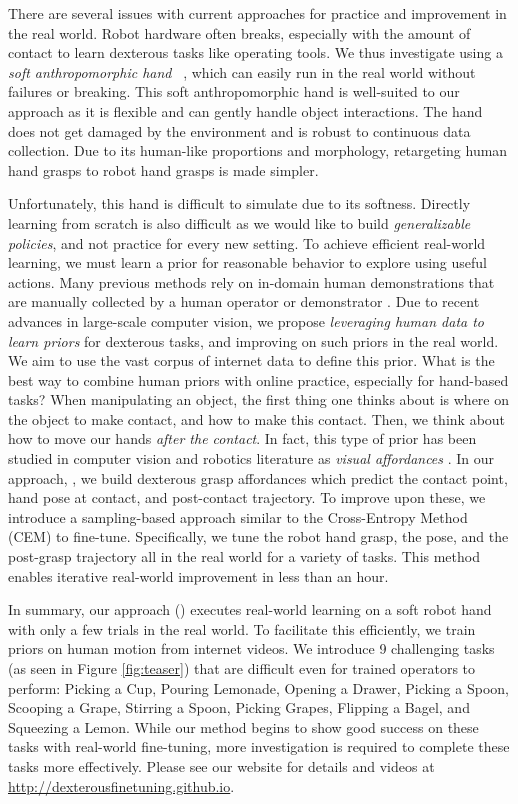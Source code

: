 There are several issues with current approaches for practice and improvement in the real world. Robot hardware often breaks, especially with the amount of contact to learn dexterous tasks like operating tools. We thus investigate using a \textit{soft anthropomorphic hand} ~\cite{mannam2023framework}, which can easily run in the real world without failures or breaking. This soft anthropomorphic hand is well-suited to our approach as it is flexible and can gently handle object interactions. The hand does not get damaged by the environment and is robust to continuous data collection. Due to its human-like proportions and morphology, retargeting human hand grasps to robot hand grasps is made simpler.  

Unfortunately, this hand is difficult to simulate due to its softness. Directly learning from scratch is also difficult as we would like to build \textit{generalizable policies}, and not practice for every new setting.  To achieve efficient real-world learning, we must learn a prior for reasonable behavior to explore using useful actions.  Many previous methods rely on in-domain human demonstrations that are manually collected by a human operator or demonstrator \cite{shaw2022video, zhao2023learning, pomerleau1988alvinn, mandlekar2021matters}. Due to recent advances in large-scale computer vision, we propose \textit{leveraging human data to learn priors} for dexterous tasks, and improving on such priors in the real world. We aim to use the vast corpus of internet data to define this prior. What is the best way to combine human priors with online practice, especially for hand-based tasks? When manipulating an object, the first thing one thinks about is where on the object to make contact, and how to make this contact. Then, we think about how to move our hands \textit{after the contact}. In fact, this type of prior has been studied in computer vision and robotics literature as \textit{visual affordances} \cite{fouhey2015defense, bahl2023affordances, hap, hotspots, 100doh, hoi, hoi4d, wang2017binge}. In our approach, \ours, we build dexterous grasp affordances which predict the contact point, hand pose at contact, and post-contact trajectory. To improve upon these, we introduce a sampling-based approach similar to the Cross-Entropy Method (CEM) to fine-tune. Specifically, we tune the robot hand grasp, the pose, and the post-grasp trajectory all in the real world for a variety of tasks.  This method enables iterative real-world improvement in less than an hour. 

In summary, our approach (\ours) executes real-world learning on a soft robot hand with only a few trials in the real world.  To facilitate this efficiently, we train priors on human motion from internet videos. We introduce 9 challenging tasks (as seen in Figure \ref{fig:teaser}) that are difficult even for trained operators to perform: Picking a Cup, Pouring Lemonade, Opening a Drawer, Picking a Spoon, Scooping a Grape, Stirring a Spoon, Picking Grapes, Flipping a Bagel, and Squeezing a Lemon.  While our method begins to show good success on these tasks with real-world fine-tuning, more investigation is required to complete these tasks more effectively. Please see our website for details and videos at \url{http://dexterousfinetuning.github.io}.
